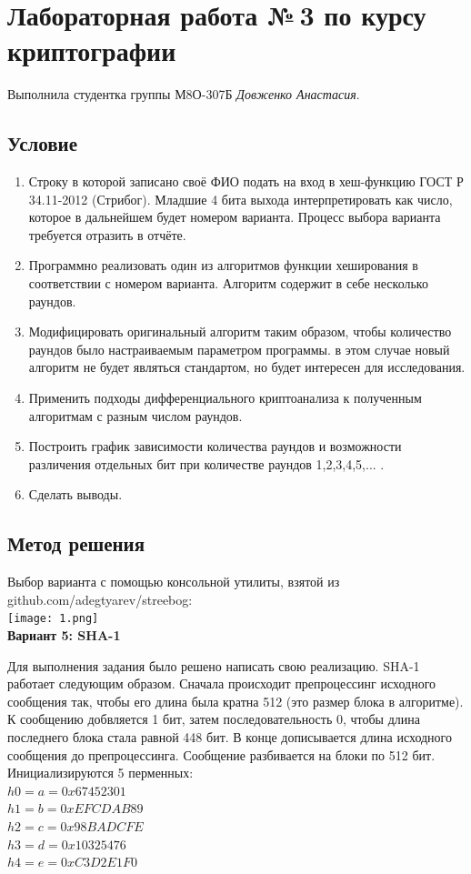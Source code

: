 \documentclass[12pt]{article}
\begin{document}
\section*{Лабораторная работа №\,3 по курсу криптографии}

Выполнила студентка группы М8О-307Б \textit{Довженко Анастасия}.

\subsection*{Условие}
\begin{enumerate}
\item Строку в которой записано своё ФИО подать на вход в хеш-функцию ГОСТ Р 34.11-2012 (Стрибог). Младшие 4 бита выхода интерпретировать как число, которое в дальнейшем будет номером варианта. Процесс выбора варианта требуется отразить в отчёте.
\item Программно реализовать один из алгоритмов функции хеширования в соответствии с номером варианта. Алгоритм содержит в себе несколько раундов.
\item Модифицировать оригинальный алгоритм таким образом, чтобы количество раундов было настраиваемым параметром программы. в этом случае новый алгоритм не будет являться стандартом, но будет интересен для исследования.
\item Применить подходы дифференциального криптоанализа к полученным алгоритмам с разным числом раундов.
\item Построить график зависимости количества раундов и возможности различения отдельных бит при количестве раундов 1,2,3,4,5,... .
\item Сделать выводы.
\end{enumerate}

\subsection*{Метод решения}
Выбор варианта с помощью консольной утилиты, взятой из github.com/adegtyarev/streebog:\\
\texttt{[image: 1.png]}\\

\textbf{Вариант 5: SHA-1}

Для выполнения задания было решено написать свою реализацию. SHA-1 работает следующим образом. Сначала происходит препроцессинг исходного сообщения так, чтобы его длина была кратна 512 (это размер блока в алгоритме). К сообщению добвляется 1 бит, затем последовательность 0, чтобы длина последнего блока стала равной 448 бит. В конце дописывается длина исходного сообщения до препроцессинга. Сообщение разбивается на блоки по 512 бит. 
Инициализируются 5 перменных:\\
$h0 = a = 0x67452301$ \\
$h1 = b = 0xEFCDAB89$ \\
$h2 = c = 0x98BADCFE$ \\
$h3 = d = 0x10325476$ \\
$h4 = e = 0xC3D2E1F0$ \\
\end{document}

